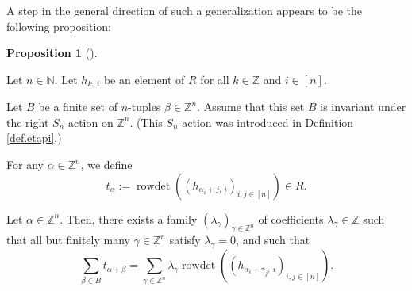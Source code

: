 \documentclass
[numbers=enddot,12pt,final,onecolumn,notitlepage,english]{scrartcl}%
\theoremstyle{definition}
\newtheorem{prop}[theo]{Proposition}
\newenvironment{proposition}[1][]
{\begin{prop}[#1]\begin{leftbar}}
{\end{leftbar}\end{prop}}
\let\sumnonlimits\sum
\renewcommand{\sum}{\sumnonlimits\limits}
\begin{document}
A step in the general direction of such a generalization appears to be the
following proposition:

\begin{proposition}
\label{prop.pre-LR.symm}Let $n\in\mathbb{N}$. Let $h_{k,\ i}$ be an element of
$R$ for all $k\in\mathbb{Z}$ and $i\in\left[  n\right]  $.

Let $B$ be a finite set of $n$-tuples $\beta\in\mathbb{Z}^{n}$. Assume that
this set $B$ is invariant under the right $S_{n}$-action on $\mathbb{Z}^{n}$.
(This $S_{n}$-action was introduced in Definition \ref{def.etapi}.)

For any $\alpha\in\mathbb{Z}^{n}$, we define%
\[
t_{\alpha}:=\operatorname*{rowdet}\left(  \left(  h_{\alpha_{i}+j,\ i}\right)
_{i,j\in\left[  n\right]  }\right)  \in R.
\]


Let $\alpha\in\mathbb{Z}^{n}$. Then, there exists a family $\left(
\lambda_{\gamma}\right)  _{\gamma\in\mathbb{Z}^{n}}$ of coefficients
$\lambda_{\gamma}\in\mathbb{Z}$ such that all but finitely many $\gamma
\in\mathbb{Z}^{n}$ satisfy $\lambda_{\gamma}=0$, and such that%
\begin{equation}
\sum_{\beta\in B}t_{\alpha+\beta}=\sum_{\gamma\in\mathbb{Z}^{n}}%
\lambda_{\gamma}\operatorname*{rowdet}\left(  \left(  h_{\alpha_{i}+\gamma
_{j},\ i}\right)  _{i,j\in\left[  n\right]  }\right)  .
\label{eq.prop.pre-LR.symm.claim}%
\end{equation}

\end{proposition}
\end{document}
